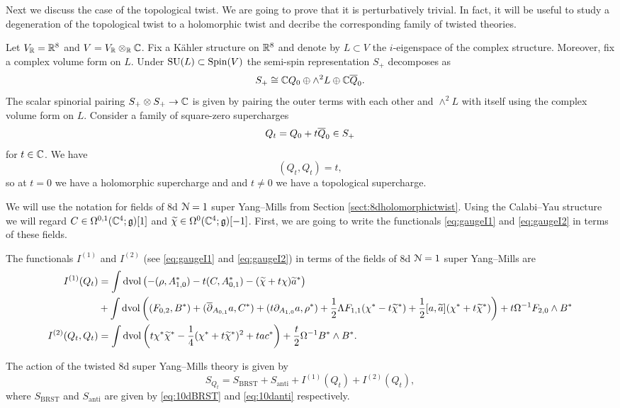 \documentclass[10pt, oneside]{article}
\begin{document}
Next we discuss the case of the topological twist. We are going to prove that it is perturbatively trivial. In fact, it will be useful to study a degeneration of the topological twist to a holomorphic twist and decribe the corresponding family of twisted theories.

Let $V_\mathbb R = \mathbb R^8$ and $V=V_\mathbb R\otimes_\mathbb R\mathbb C$. Fix a K\"ahler structure on $\mathbb R^8$ and denote by $L\subset V$ the $i$-eigenspace of the complex structure. Moreover, fix a complex volume form on $L$. Under $\mathrm{SU}(L)\subset \mathrm{Spin}(V)$ the semi-spin representation $S_+$ decomposes as
\[S_+\cong \mathbb C Q_0\oplus \wedge^2 L\oplus \mathbb C \overline{Q}_0.\]
The scalar spinorial pairing $S_+\otimes S_+\rightarrow \mathbb C$ is given by pairing the outer terms with each other and $\wedge^2L$ with itself using the complex volume form on $L$. Consider a family of square-zero supercharges
\begin{equation}
Q_t = Q_0 + t\Bar{Q}_0\in S_+
\label{eq:8dHodgefamily}
\end{equation}
for $t\in\mathbb C$. We have
\[(Q_t, Q_t) = t,\]
so at $t=0$ we have a holomorphic supercharge and and $t\neq 0$ we have a topological supercharge.

We will use the notation for fields of 8d $\mathcal N=1$ super Yang--Mills from Section \ref{sect:8dholomorphictwist}. Using the Calabi--Yau structure we will regard $C\in\Omega^{0, 1}(\mathbb C^4;\mathfrak g)[1]$ and $\widetilde{\chi}\in\Omega^0(\mathbb C^4;\mathfrak g)[-1]$. First, we are going to write the functionals \eqref{eq:gaugeI1} and \eqref{eq:gaugeI2} in terms of these fields.

\begin{prop}
The functionals $I^{(1)}$ and $I^{(2)}$ (see \eqref{eq:gaugeI1} and \eqref{eq:gaugeI2}) in terms of the fields of 8d $\mathcal N=1$ super Yang--Mills are
\begin{align*}
I^{(1)}(Q_t) &= \int \operatorname{dvol}\left(-(\rho, A_{1, 0}^*) - t(C, A_{0, 1}^*) - (\widetilde{\chi} + t\chi)\widetilde{a}^*\right) \\
&+ \int\operatorname{dvol}\left((F_{0, 2}, B^*)  + (\overline{\partial}_{A_{0, 1}} a, C^*) + (t\partial_{A_{1, 0}} a, \rho^*) + \frac{1}{2}\Lambda F_{1, 1}(\chi^* - t\widetilde{\chi}^*) + \frac{1}{2}[a, \widetilde{a}](\chi^*+t\widetilde{\chi}^*)\right) + t\Omega^{-1} F_{2, 0}\wedge B^* \\
I^{(2)}(Q_t, Q_t) &= \int \operatorname{dvol} \left(t\chi^*\widetilde{\chi}^* -\frac{1}{4}(\chi^* + t\widetilde{\chi}^*)^2 + tac^*\right) + \frac{t}{2}\Omega^{-1}B^*\wedge B^* .
\end{align*}
\end{prop}

The action of the twisted 8d super Yang--Mills theory is given by
\[S_{Q_t} = S_{\mathrm{BRST}} + S_{\mathrm{anti}} + I^{(1)}(Q_t) + I^{(2)}(Q_t),\]
where $S_{\mathrm{BRST}}$ and $S_{\mathrm{anti}}$ are given by \eqref{eq:10dBRST} and \eqref{eq:10danti} respectively.
\end{document}
